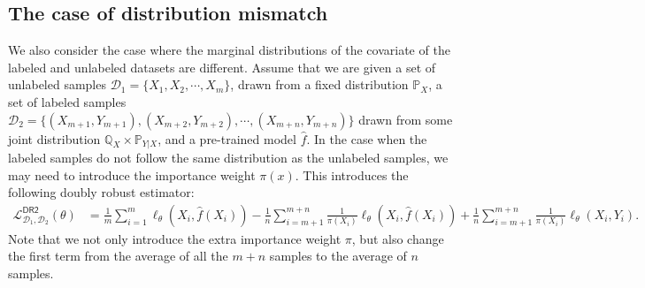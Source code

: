 \subsection{The case of distribution mismatch}\label{sec:mismatch}


We also consider the case where the marginal distributions of the covariate of the labeled and unlabeled datasets are different.
Assume that we are given a set of unlabeled samples $\mathcal{D}_1 = \{X_1,X_2,\cdots, X_m\}$, drawn from a fixed distribution $\mathbb{P}_X$, a set of labeled samples $\mathcal{D}_2 =\{(X_{m+1}, Y_{m+1}), (X_{m+2}, Y_{m+2}), \cdots, (X_{m+n}, Y_{m+n})\}$ drawn from some joint distribution $\mathbb{Q}_X\times \mathbb{P}_{Y|X}$, and a pre-trained model  $\hat f$. 
In the case when the labeled samples do not follow the same distribution as the unlabeled samples, we may need to introduce the importance weight $\pi(x)$. This introduces the following doubly robust estimator:
\begin{align*}
\mathcal{L}^{\mathsf{DR2}}_{\mathcal{D}_1,\mathcal{D}_2}(\theta) 
& = \frac{1}{m}  \sum_{i=1}^{m} \ell_\theta(X_i, \hat f(X_i)) -  \frac{1}{n} \sum_{i=m+1}^{m+n} \frac{1}{\pi(X_i)}\ell_\theta(X_i, \hat f(X_i))  + \frac{1}{n} \sum_{i=m+1}^{m+n} \frac{1}{\pi(X_i)}\ell_\theta(X_i, Y_i). 
\end{align*}
Note that we not only introduce the extra importance weight $\pi$, but also change the first term from the average of all the $m+n$ samples to the average of $n$ samples. 


